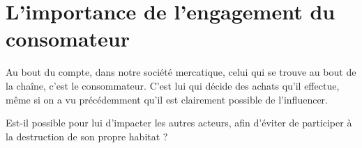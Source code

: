 \section{L'importance de l'engagement du consomateur}

\smallbreak Au bout du compte, dans notre société mercatique, celui qui se trouve au bout de la chaîne, c'est le consommateur.
C'est lui qui décide des achats qu'il effectue, même si on a vu précédemment qu'il est clairement possible de l'influencer.

Est-il possible pour lui d'impacter les autres acteurs, afin d'éviter de participer à la destruction de son propre habitat ?
